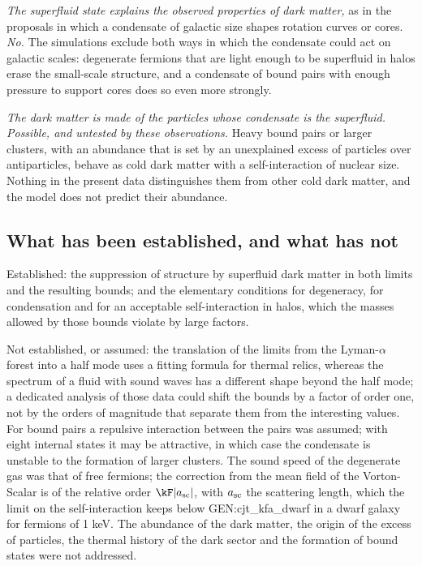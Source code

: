 \emph{The superfluid state explains the observed properties of dark matter,} as in the proposals in
which a condensate of galactic size shapes rotation curves or cores. \emph{No.} The simulations
exclude both ways in which the condensate could act on galactic scales: degenerate fermions that are
light enough to be superfluid in halos erase the small-scale structure, and a condensate of bound
pairs with enough pressure to support cores does so even more strongly.

\emph{The dark matter is made of the particles whose condensate is the superfluid.} \emph{Possible,
and untested by these observations.} Heavy bound pairs or larger clusters, with an abundance that is
set by an unexplained excess of particles over antiparticles, behave as cold dark matter with a
self-interaction of nuclear size. Nothing in the present data distinguishes them from other cold dark
matter, and the model does not predict their abundance.

\subsection{What has been established, and what has not}

Established: the suppression of structure by superfluid dark matter in both limits and the resulting
bounds; and the elementary conditions for degeneracy, for condensation and for an acceptable
self-interaction in halos, which the masses allowed by those bounds violate by large factors.

Not established, or assumed: the translation of the limits from the Lyman-$\alpha$ forest into a
half mode uses a fitting formula for thermal relics, whereas the spectrum of a fluid with sound
waves has a different shape beyond the half mode; a dedicated analysis of those data could shift the
bounds by a factor of order one, not by the orders of magnitude that separate them from the
interesting values. For bound pairs a repulsive interaction between the pairs was assumed; with
eight internal states it may be attractive, in which case the condensate is unstable to the
formation of larger clusters. The sound speed of the degenerate gas was that of free fermions; the
correction from the mean field of the Vorton-Scalar is of the relative order $\kF|a_{\rm sc}|$, with $a_{\rm sc}$
the scattering length, which the limit on the self-interaction keeps below {{GEN:cjt_kfa_dwarf}} in
a dwarf galaxy for fermions of 1 keV. The abundance of the dark matter, the origin of the excess of
particles, the thermal history of the dark sector and the formation of bound states were not
addressed.
